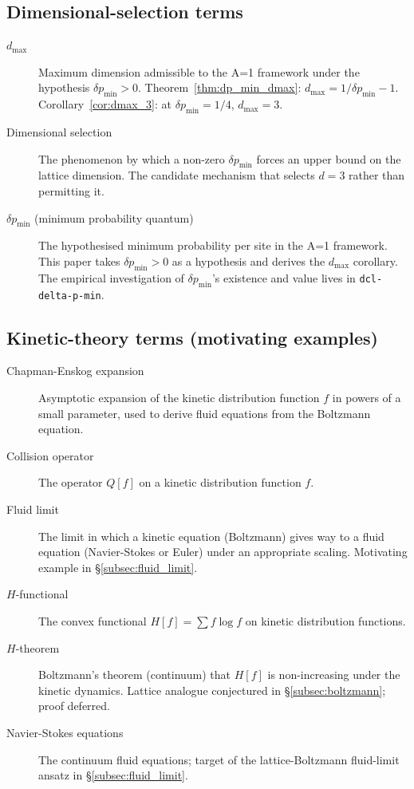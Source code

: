 \subsection*{Dimensional-selection terms}

\begin{description}
\item[$d_\max$]
   Maximum dimension admissible to the A=1 framework under the
   hypothesis $\delta p_\min > 0$.  Theorem~\ref{thm:dp_min_dmax}:
   $d_\max = 1/\delta p_\min - 1$.  Corollary~\ref{cor:dmax_3}: at
   $\delta p_\min = 1/4$, $d_\max = 3$.

\item[Dimensional selection]
   The phenomenon by which a non-zero $\delta p_\min$ forces an upper
   bound on the lattice dimension.  The candidate mechanism that
   selects $d = 3$ rather than permitting it.

\item[$\delta p_\min$ (minimum probability quantum)]
   The hypothesised minimum probability per site in the A=1
   framework.  This paper takes $\delta p_\min > 0$ as a hypothesis
   and derives the $d_\max$ corollary.  The empirical investigation
   of $\delta p_\min$'s existence and value lives in
   \texttt{dcl-delta-p-min}.
\end{description}

\subsection*{Kinetic-theory terms (motivating examples)}

\begin{description}
\item[Chapman-Enskog expansion]
   Asymptotic expansion of the kinetic distribution function $f$ in
   powers of a small parameter, used to derive fluid equations from
   the Boltzmann equation.

\item[Collision operator]
   The operator $Q[f]$ on a kinetic distribution function $f$.

\item[Fluid limit]
   The limit in which a kinetic equation (Boltzmann) gives way to a
   fluid equation (Navier-Stokes or Euler) under an appropriate
   scaling.  Motivating example in
   \S\ref{subsec:fluid_limit}.

\item[$H$-functional]
   The convex functional $H[f] = \sum f \log f$ on kinetic
   distribution functions.

\item[$H$-theorem]
   Boltzmann's theorem (continuum) that $H[f]$ is non-increasing
   under the kinetic dynamics.  Lattice analogue conjectured in
   \S\ref{subsec:boltzmann}; proof deferred.

\item[Navier-Stokes equations]
   The continuum fluid equations; target of the lattice-Boltzmann
   fluid-limit ansatz in \S\ref{subsec:fluid_limit}.
\end{description}
